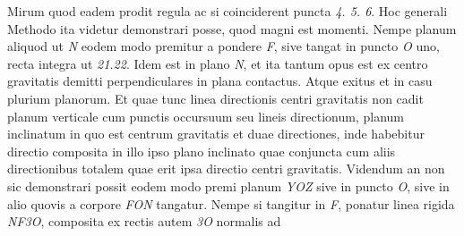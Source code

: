 \pstart
Mirum 
quod eadem prodit regula ac si coinciderent puncta \textit{4. 5. 6}. 
Hoc generali Methodo ita videtur demonstrari posse, quod magni est momenti. 
Nempe planum aliquod ut \textit{N} eodem modo premitur a pondere \textit{F}, sive tangat in puncto \textit{O} uno,  
recta integra ut \textit{21.22}. Idem est in plano \textit{N}, et ita tantum opus est ex centro gravitatis demitti perpendiculares in plana contactus. Atque 
exitus et in casu plurium planorum.
\pend
\pstart
Et quae tunc linea directionis centri gravitatis non cadit planum verticale cum punctis occursuum seu lineis directionum,
planum inclinatum in quo est centrum gravitatis et duae directiones, inde habebitur directio composita in illo ipso plano inclinato quae conjuncta cum aliis directionibus 
totalem quae erit ipsa directio centri gravitatis. 
Videndum an non sic demonstrari possit eodem modo premi planum
\textit{YOZ} sive in puncto \textit{O}, sive in alio quovis a corpore \textit{FON} tangatur. Nempe si tangitur in \textit{F}, ponatur linea rigida \textit{NF3O}, composita ex rectis 
autem \textit{3O} normalis ad 
